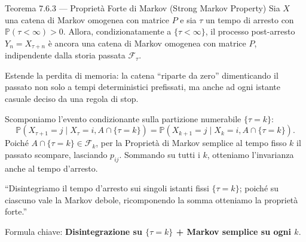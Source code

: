 \documentclass[11pt,a4paper]{report}
\begin{document}
\begin{teoremabox}{Teorema 7.6.3 --- Proprietà Forte di Markov (Strong Markov Property)}
Sia $X$ una catena di Markov omogenea con matrice $P$ e sia $\tau$ un tempo di arresto con $\mathbb{P}(\tau < \infty) > 0$. Allora, condizionatamente a $\{\tau < \infty\}$, il processo post-arresto $Y_n = X_{\tau + n}$ è ancora una catena di Markov omogenea con matrice $P$, indipendente dalla storia passata $\mathcal{F}_\tau$.

\begin{cosafa}
Estende la perdita di memoria: la catena ``riparte da zero'' dimenticando il passato non solo a tempi deterministici prefissati, ma anche ad ogni istante casuale deciso da una regola di stop.
\end{cosafa}

\begin{dimostrazione}
Scomponiamo l'evento condizionante sulla partizione numerabile $\{\tau = k\}$:
\[
\mathbb{P}(X_{\tau+1} = j \mid X_\tau = i, A \cap \{\tau = k\}) = \mathbb{P}(X_{k+1} = j \mid X_k = i, A \cap \{\tau = k\}).
\]
Poiché $A \cap \{\tau = k\} \in \mathcal{F}_k$, per la Proprietà di Markov semplice al tempo fisso $k$ il passato scompare, lasciando $p_{ij}$. Sommando su tutti i $k$, otteniamo l'invarianza anche al tempo d'arresto.
\end{dimostrazione}

\begin{oralbox}
``Disintegriamo il tempo d'arresto sui singoli istanti fissi $\{\tau = k\}$; poiché su ciascuno vale la Markov debole, ricomponendo la somma otteniamo la proprietà forte.''
\end{oralbox}

\begin{tipbox}
Formula chiave: \textbf{Disintegrazione su $\{\tau = k\}$ + Markov semplice su ogni $k$}.
\end{tipbox}
\end{teoremabox}

\vspace{0.3cm}
\end{document}
